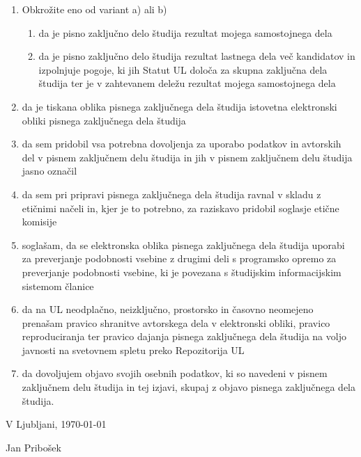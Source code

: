 \begin{enumerate}
	\item Obkrožite eno od variant a) ali b)
	
		\begin{enumerate}
			\item da je pisno zaključno delo študija rezultat mojega samostojnega dela
			
			\item da je pisno zaključno delo študija rezultat lastnega dela več kandidatov in izpolnjuje pogoje, ki
			jih Statut UL določa za skupna zaključna dela študija ter je v zahtevanem deležu rezultat
			mojega samostojnega dela
		\end{enumerate}
	
	\item da je tiskana oblika pisnega zaključnega dela študija istovetna elektronski obliki pisnega
	zaključnega dela študija
	
	\item da sem pridobil vsa potrebna dovoljenja za uporabo podatkov in avtorskih del v pisnem
	zaključnem delu študija in jih v pisnem zaključnem delu študija jasno označil
	
	\item da sem pri pripravi pisnega zaključnega dela študija ravnal v skladu z etičnimi načeli in, kjer je to
	potrebno, za raziskavo pridobil soglasje etične komisije
	
	\item soglašam, da se elektronska oblika pisnega zaključnega dela študija uporabi za preverjanje
	podobnosti vsebine z drugimi deli s programsko opremo za preverjanje podobnosti vsebine, ki je
	povezana s študijskim informacijskim sistemom članice
	
	\item da na UL neodplačno, neizključno, prostorsko in časovno neomejeno prenašam pravico shranitve
	avtorskega dela v elektronski obliki, pravico reproduciranja ter pravico dajanja pisnega zaključnega
	dela študija na voljo javnosti na svetovnem spletu preko Repozitorija UL
	
	\item da dovoljujem objavo svojih osebnih podatkov, ki so navedeni v pisnem zaključnem delu študija in
	tej izjavi, skupaj z objavo pisnega zaključnega dela študija.
	
\end{enumerate}

\vfill


V Ljubljani, \today 
\vspace{1cm}

\hspace*{\fill}Jan Pribošek

\fi
